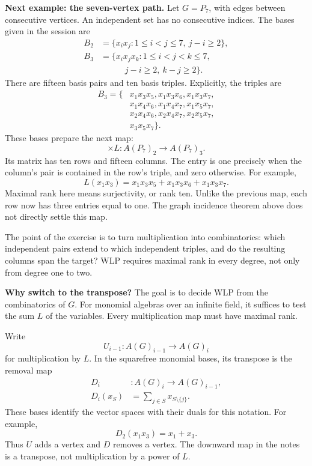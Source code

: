 \medskip\noindent
\textbf{Next example: the seven-vertex
path.}
Let $G=P_7$, with edges between
consecutive vertices.
An independent set has no consecutive
indices.
The bases given in the session are
$$
\begin{aligned}
B_2&=\{x_ix_j:1\leq i<j\leq7,\
j-i\geq2\},\\
B_3&=\{x_ix_jx_k:1\leq i<j<k\leq7,\\
&\hspace{35pt}j-i\geq2,\ k-j\geq2\}.
\end{aligned}
$$
There are fifteen basis pairs and ten
basis triples. Explicitly, the triples
are
$$
\begin{aligned}
B_3=\{&
x_1x_3x_5,x_1x_3x_6,x_1x_3x_7,\\
&x_1x_4x_6,x_1x_4x_7,x_1x_5x_7,\\
&x_2x_4x_6,x_2x_4x_7,x_2x_5x_7,\\
&x_3x_5x_7\}.
\end{aligned}
$$
These bases prepare the next map:
$$
\times L:A(P_7)_2\longrightarrow A(P_7)_3.
$$
Its matrix has ten rows and fifteen
columns. The entry is one precisely
when the column's pair is contained
in the row's triple, and zero otherwise.
For example,
$$
L(x_1x_3)=
x_1x_3x_5+x_1x_3x_6+x_1x_3x_7.
$$
Maximal rank here means surjectivity,
or rank ten.
Unlike the previous map, each row now
has three entries equal to one.
The graph incidence theorem above
does not directly settle this map.

The point of the exercise is to turn
multiplication into combinatorics:
which independent pairs extend to which
independent triples, and do the resulting
columns span the target?
WLP requires maximal rank in every
degree, not only from degree one to two.

\medskip\noindent
\textbf{Why switch to the transpose?}
The goal is to decide WLP from the
combinatorics of $G$.
For monomial algebras over an infinite
field, it suffices to test the sum $L$
of the variables.
Every multiplication map must have
maximal rank.

Write
$$
U_{i-1}:A(G)_{i-1}\longrightarrow A(G)_i
$$
for multiplication by $L$.
In the squarefree monomial bases,
its transpose is the removal map
$$
\begin{aligned}
D_i&:A(G)_i\longrightarrow A(G)_{i-1},\\
D_i(x_S)&=\sum_{j\in S}x_{S\setminus\{j\}}.
\end{aligned}
$$
These bases identify the vector spaces
with their duals for this notation.
For example,
$$
D_2(x_1x_3)=x_1+x_3.
$$
Thus $U$ adds a vertex and $D$ removes
a vertex. The downward map in the
notes is a transpose, not
multiplication by a power of $L$.

